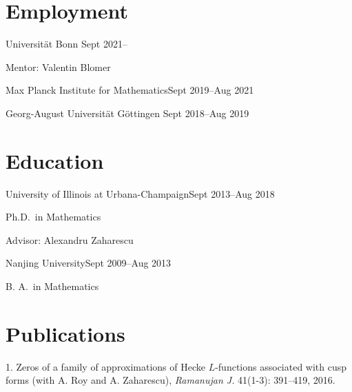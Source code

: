 \documentclass[margin,line,pifont,palatino,courier]{res}
\newenvironment{list1}{
  \begin{list}{\ding{113}}{%
      \setlength{\itemsep}{0in}
      \setlength{\parsep}{0in} \setlength{\parskip}{0in}
      \setlength{\topsep}{0in} \setlength{\partopsep}{0in}
      \setlength{\leftmargin}{0.17in}}}{\end{list}}
\begin{document}
\begin{resume}
\section{\sc Employment} 

{Universit\"at Bonn}  \hfill{Sept 2021--}

\begin{list1}

\item[] Mentor: Valentin Blomer 
\end{list1}

{Max Planck Institute for Mathematics}\hfill{Sept 2019--Aug 2021}



{Georg-August Universit\"at G\"ottingen} \hfill{Sept 2018--Aug 2019}




\section{\sc Education}

{University of Illinois at Urbana-Champaign}\hfill{Sept 2013--Aug 2018}\\
\vspace*{-.1in}
\begin{list1}
\item[] Ph.D.~in Mathematics
\item[] Advisor: Alexandru Zaharescu

\end{list1}

{ Nanjing University}\hfill{Sept 2009--Aug 2013}\\
\vspace*{-.1in}
\begin{list1}
\item[] B. A.~in Mathematics

\end{list1}






\section{\sc Publications}
1. {Zeros of a family of approximations of {H}ecke {$L$}-functions
associated with cusp forms} (with A. Roy and A. Zaharescu), {\it Ramanujan J.} 41(1-3): 391--419, 2016.


\end{resume}
\end{document}
